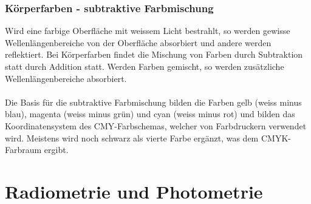 \subsubsection{Körperfarben - subtraktive Farbmischung}
Wird eine farbige Oberfläche mit weissem Licht bestrahlt, so werden gewisse Wellenlängenbereiche von der Oberfläche absorbiert und andere werden reflektiert. Bei Körperfarben findet die Mischung von Farben durch Subtraktion statt durch Addition statt. Werden Farben gemischt, so werden zusätzliche Wellenlängenbereiche absorbiert.
\\\\
Die Basis für die subtraktive Farbmischung bilden die Farben gelb (weiss minus blau), magenta (weiss minus grün) und cyan (weiss minus rot) und bilden das Koordinatensystem des CMY-Farbschemas, welcher von Farbdruckern verwendet wird. Meistens wird noch schwarz als vierte Farbe ergänzt, was dem CMYK-Farbraum ergibt.
\section{Radiometrie und Photometrie}





